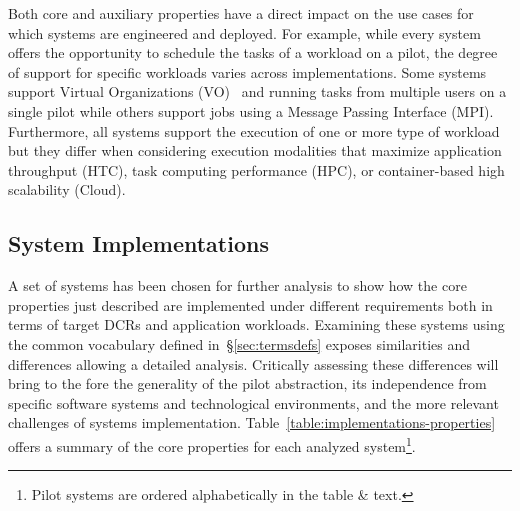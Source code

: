 \documentclass{sig-alternate}
\begin{document}
Both core and auxiliary properties have a direct impact on the use cases for
which \pilot systems are engineered and deployed. For example, while every
\pilot system offers the opportunity to schedule the tasks of a workload on a
pilot, the degree of support for specific workloads varies across
implementations. Some \pilot systems support Virtual Organizations
(VO)~\cite{foster2001} and running tasks from multiple users on a single pilot
while others support jobs using a Message Passing Interface (MPI). Furthermore,
all \pilot systems support the execution of one or more type of workload but
they differ when considering execution modalities that maximize application
throughput (HTC), task computing performance (HPC), or container-based high
scalability (Cloud).  



%
\subsection{\pilot System Implementations}
\label{sec:implementations}

A set of \pilot systems has been chosen for further analysis to show how the
core properties just described are implemented under different requirements both
in terms of target DCRs and application workloads. Examining these \pilot
systems using the common vocabulary defined in~\S\ref{sec:termsdefs} exposes
similarities and differences allowing a detailed analysis. Critically assessing
these differences will bring to the fore the generality of the pilot
abstraction, its independence from specific software systems and technological
environments, and the more relevant challenges of \pilot systems implementation.
Table~\ref{table:implementations-properties} offers a summary of the core
properties for each analyzed \pilot system\protect\footnote{Pilot systems are
  ordered alphabetically in the table \& text.}.
\end{document}
